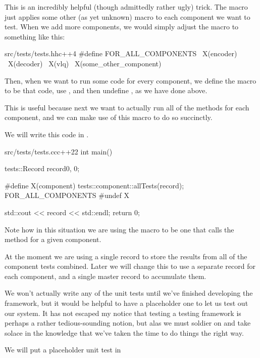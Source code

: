 This is an incredibly helpful (though admittedly rather ugly) trick. The  macro just applies some other (as yet unknown) macro  to each component we want to test. When we add more components, we would simply adjust the  macro to something like this:

\begin{file}{src/tests/tests.hh}{c++}{4}
#define FOR_ALL_COMPONENTS  \
    X(encoder)              \
    X(decoder)              \
    X(vlq)                  \
    X(some_other_component) \
\end{file}

Then, when we want to run some code for every component, we define the macro  to be that code, use , and then undefine , as we have done above.

This is useful because next we want to actually run all of the  methods for each component, and we can make use of this macro to do so succinctly.

We will write this code in .

\begin{file}{src/tests/tests.cc}{c++}{22}
int main()
{

    tests::Record record{0, 0};

#define X(component) tests::component::allTests(record);
    FOR_ALL_COMPONENTS
#undef X

    std::cout
        << record
        << std::endl;
    return 0;
}
\end{file}

Note how in this situation we are using the macro  to be one that calls the  method for a given component.

At the moment we are using a single record to store the results from all of the component tests combined. Later we will change this to use a separate record for each component, and a single master record to accumulate them.

We won't actually write any of the unit tests until we've finished developing the framework, but it would be helpful to have a placeholder one to let us test out our system. It has not escaped my notice that testing a testing framework is perhaps a rather tedious-sounding notion, but alas we must soldier on and take solace in the knowledge that we've taken the time to do things the right way.

We will put a placeholder unit test in 

